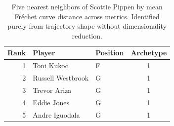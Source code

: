 \begin{table}[htbp]
  \centering\small
  \begin{tabular}{rllc}
    \toprule
    Rank & Player & Position & Archetype \\
    \midrule
    1 & Toni Kukoc & F & 1 \\
    2 & Russell Westbrook & G & 1 \\
    3 & Trevor Ariza & G & 1 \\
    4 & Eddie Jones & G & 1 \\
    5 & Andre Iguodala & G & 1 \\
    \bottomrule
  \end{tabular}
  \caption{Five nearest neighbors of Scottie Pippen by mean Fr\'{e}chet curve distance across metrics. Identified purely from trajectory shape without dimensionality reduction.}
  \label{tab:Scottie_Pippen_frechet_curve_neighbors}
\end{table}

